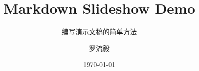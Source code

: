 \title{Markdown Slideshow Demo}
\subtitle{编写演示文稿的简单方法}
\author{罗流毅}
\date{\today}
\def\website{https://github.com/xluoly}
